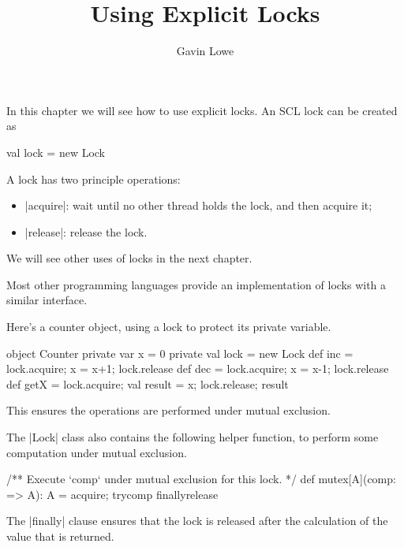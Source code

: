 \documentclass[notes,color]{sepslide0}
\title{Using Explicit Locks}
\author{Gavin Lowe}
\begin{document}
\begin{slide}
  
  \Title

\end{slide}


\begin{slide}

In this chapter we will see how to use explicit locks.  An SCL lock can be
created as
%
\begin{scala}
val lock = new Lock
\end{scala}

A lock has two principle operations:
%
\begin{itemize}
\item |acquire|: wait until no other thread holds the lock, and then acquire
  it;

\item |release|: release the lock.
\end{itemize}

We will see other uses of locks in the next chapter. 

Most other programming languages provide an implementation of locks with a
similar interface.
\end{slide}


\begin{slide}

Here's a counter object, using a lock to protect its private variable.
%
\begin{scala}
object Counter{
  private var x = 0
  private val lock = new Lock
  def inc = { lock.acquire; x = x+1; lock.release }
  def dec = { lock.acquire; x = x-1; lock.release }
  def getX = { lock.acquire; val result = x; lock.release; result }
}
\end{scala}
%
This ensures the operations are performed under mutual exclusion. 
\end{slide}


\begin{slide}

The |Lock| class also contains the following helper function, to perform some
computation under mutual exclusion. 
\begin{scala}
  /** Execute `comp` under mutual exclusion for this lock. */
  def mutex[A](comp: => A): A = {
    acquire; try{comp} finally{release}
  } 
\end{scala}
%
The |finally| clause ensures that the lock is released after the calculation
of the value that is returned.
\end{slide}
\end{document}
